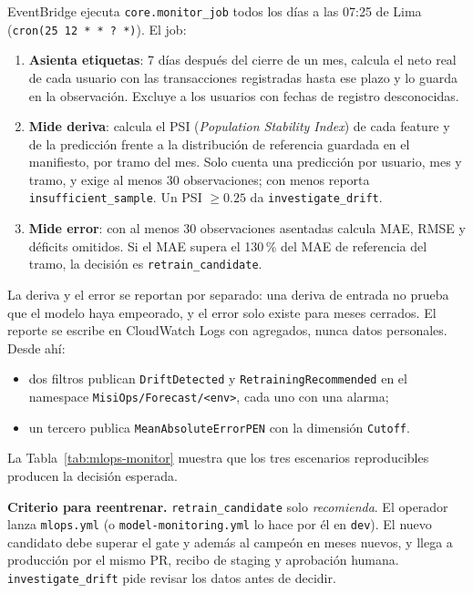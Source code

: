 EventBridge ejecuta \texttt{core.monitor\_job} todos los días a las 07:25 de Lima (\texttt{cron(25 12 * * ? *)}). El job:
\begin{enumerate}
    \item \textbf{Asienta etiquetas}: 7 días después del cierre de un mes, calcula el neto real de cada usuario con las transacciones registradas hasta ese plazo y lo guarda en la observación. Excluye a los usuarios con fechas de registro desconocidas.
    \item \textbf{Mide deriva}: calcula el PSI (\textit{Population Stability Index}) de cada feature y de la predicción frente a la distribución de referencia guardada en el manifiesto, por tramo del mes. Solo cuenta una predicción por usuario, mes y tramo, y exige al menos 30 observaciones; con menos reporta \texttt{insufficient\_sample}. Un PSI $\geq 0.25$ da \texttt{investigate\_drift}.
    \item \textbf{Mide error}: con al menos 30 observaciones asentadas calcula MAE, RMSE y déficits omitidos. Si el MAE supera el 130\,\% del MAE de referencia del tramo, la decisión es \texttt{retrain\_candidate}.
\end{enumerate}

La deriva y el error se reportan por separado: una deriva de entrada no prueba que el modelo haya empeorado, y el error solo existe para meses cerrados. El reporte se escribe en CloudWatch Logs con agregados, nunca datos personales. Desde ahí:
\begin{itemize}
    \item dos filtros publican \texttt{DriftDetected} y \texttt{RetrainingRecommended} en el namespace \texttt{MisiOps/Forecast/<env>}, cada uno con una alarma;
    \item un tercero publica \texttt{MeanAbsoluteErrorPEN} con la dimensión \texttt{Cutoff}.
\end{itemize}
La Tabla~\ref{tab:mlops-monitor} muestra que los tres escenarios reproducibles producen la decisión esperada.



\textbf{Criterio para reentrenar.} \texttt{retrain\_candidate} solo \emph{recomienda}. El operador lanza \texttt{mlops.yml} (o \texttt{model-monitoring.yml} lo hace por él en \texttt{dev}). El nuevo candidato debe superar el gate y además al campeón en meses nuevos, y llega a producción por el mismo PR, recibo de staging y aprobación humana. \texttt{investigate\_drift} pide revisar los datos antes de decidir.

